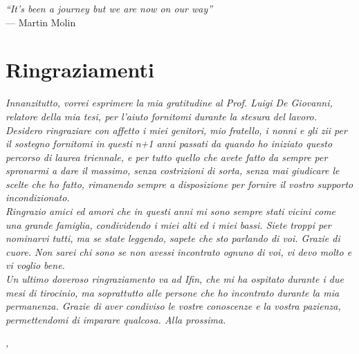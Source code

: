 
\cleardoublepage
{}
{}

\begin{flushright}{
	\slshape    
	``It's been a journey but we are now on our way''} \\ 
	\medskip
    --- Martin Molin
\end{flushright}


\bigskip

\begingroup
\let\clearpage\relax
\let\cleardoublepage\relax
\let\cleardoublepage\relax

\chapter*{Ringraziamenti}

\noindent \textit{Innanzitutto, vorrei esprimere la mia gratitudine al Prof. Luigi De Giovanni, relatore della mia tesi, per l'aiuto fornitomi durante la stesura del lavoro.}\\

\noindent \textit{Desidero ringraziare con affetto i miei genitori, mio fratello, i nonni e gli zii per il sostegno fornitomi in questi n+1 anni passati da quando ho iniziato questo percorso di laurea triennale, e per tutto quello che avete fatto da sempre per spronarmi a dare il massimo, senza costrizioni di sorta, senza mai giudicare le scelte che ho fatto, rimanendo sempre a disposizione per fornire il vostro supporto incondizionato.}\\

\noindent \textit{Ringrazio amici ed amori che in questi anni mi sono sempre stati vicini come una grande famiglia, condividendo i miei alti ed i miei bassi. Siete troppi per nominarvi tutti, ma se state leggendo, sapete che sto parlando di voi. Grazie di cuore. Non sarei chi sono se non avessi incontrato ognuno di voi, vi devo molto e vi voglio bene.}\\

\noindent \textit{Un ultimo doveroso ringraziamento va ad Ifin, che mi ha ospitato durante i due mesi di tirocinio, ma soprattutto alle persone che ho incontrato durante la mia permanenza. Grazie di aver condiviso le vostre conoscenze e la vostra pazienza, permettendomi di imparare qualcosa. Alla prossima.}\\
\bigskip

\noindent\textit{\myLocation, \myTime}
\hfill \myName

\endgroup

